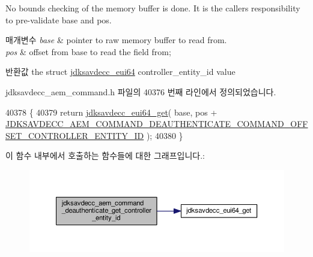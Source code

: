 No bounds checking of the memory buffer is done. It is the caller\textquotesingle{}s responsibility to pre-\/validate base and pos.


\begin{DoxyParams}{매개변수}
{\em base} & pointer to raw memory buffer to read from. \\
\hline
{\em pos} & offset from base to read the field from; \\
\hline
\end{DoxyParams}
\begin{DoxyReturn}{반환값}
the struct \hyperlink{structjdksavdecc__eui64}{jdksavdecc\+\_\+eui64} controller\+\_\+entity\+\_\+id value 
\end{DoxyReturn}


jdksavdecc\+\_\+aem\+\_\+command.\+h 파일의 40376 번째 라인에서 정의되었습니다.


\begin{DoxyCode}
40378 \{
40379     \textcolor{keywordflow}{return} \hyperlink{group__eui64_ga2652311a25a6b91cddbed75c108c7031}{jdksavdecc\_eui64\_get}( base, pos + 
      \hyperlink{group__command__deauthenticate_ga24d9d5ec78e727c0194d110b4c5e743a}{JDKSAVDECC\_AEM\_COMMAND\_DEAUTHENTICATE\_COMMAND\_OFFSET\_CONTROLLER\_ENTITY\_ID}
       );
40380 \}
\end{DoxyCode}


이 함수 내부에서 호출하는 함수들에 대한 그래프입니다.\+:
\nopagebreak
\begin{figure}[H]
\begin{center}
\leavevmode
\includegraphics[width=350pt]{group__command__deauthenticate_ga42b199be8914bcf71025b626d0d66c6e_cgraph}
\end{center}
\end{figure}



